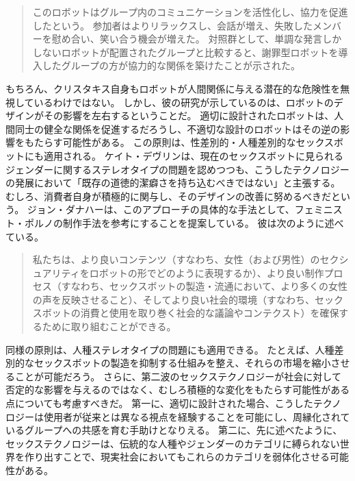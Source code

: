 \documentclass[paper=a4,book,openany]{jlreq} \usepackage{mystyle}
\begin{document}
\begin{quote}
このロボットはグループ内のコミュニケーションを活性化し、協力を促進したという。
参加者はよりリラックスし、会話が増え、失敗したメンバーを慰め合い、笑い合う機会が増えた。
対照群として、単調な発言しかしないロボットが配置されたグループと比較すると、謝罪型ロボットを導入したグループの方が協力的な関係を築けたことが示された。
\citep{christakis19:_how_ai_will_rewir_us}
\end{quote}

もちろん、クリスタキス自身もロボットが人間関係に与える潜在的な危険性を無視しているわけではない。
しかし、彼の研究が示しているのは、ロボットのデザインがその影響を左右するということだ。
適切に設計されたロボットは、人間同士の健全な関係を促進するだろうし、不適切な設計のロボットはその逆の影響をもたらす可能性がある。
この原則は、性差別的・人種差別的なセックスボットにも適用される。
ケイト・デヴリンは、現在のセックスボットに見られるジェンダーに関するステレオタイプの問題を認めつつも、こうしたテクノロジーの発展において「既存の道徳的潔癖さを持ち込むべきではない」と主張する。
むしろ、消費者自身が積極的に関与し、そのデザインの改善に努めるべきだという\citep{devlin15:_in_defen_sex_machin}。
ジョン・ダナハーは、このアプローチの具体的な手法として、フェミニスト・ポルノの制作手法を参考にすることを提案している。
彼は次のように述べている。

\begin{quote}
私たちは、より良いコンテンツ（すなわち、女性（および男性）のセクシュアリティをロボットの形でどのように表現するか）、より良い制作プロセス（すなわち、セックスボットの製造・流通において、より多くの女性の声を反映させること）、そしてより良い社会的環境（すなわち、セックスボットの消費と使用を取り巻く社会的な議論やコンテクスト）を確保するために取り組むことができる。
\citep[p.143]{danaher19:_build_better_sex_robot}
\end{quote}

同様の原則は、人種ステレオタイプの問題にも適用できる。
たとえば、人種差別的なセックスボットの製造を抑制する仕組みを整え、それらの市場を縮小させることが可能だろう。
さらに、第二波のセックステクノロジーが社会に対して否定的な影響を与えるのではなく、むしろ積極的な変化をもたらす可能性がある点についても考慮すべきだ。
第一に、適切に設計された場合、こうしたテクノロジーは使用者が従来とは異なる視点を経験することを可能にし、周縁化されているグループへの共感を育む手助けとなりえる\citep{ramirez20:_can_techn_help_us_be_more_empat}。
第二に、先に述べたように、セックステクノロジーは、伝統的な人種やジェンダーのカテゴリに縛られない世界を作り出すことで、現実社会においてもこれらのカテゴリを弱体化させる可能性がある。
\end{document}
